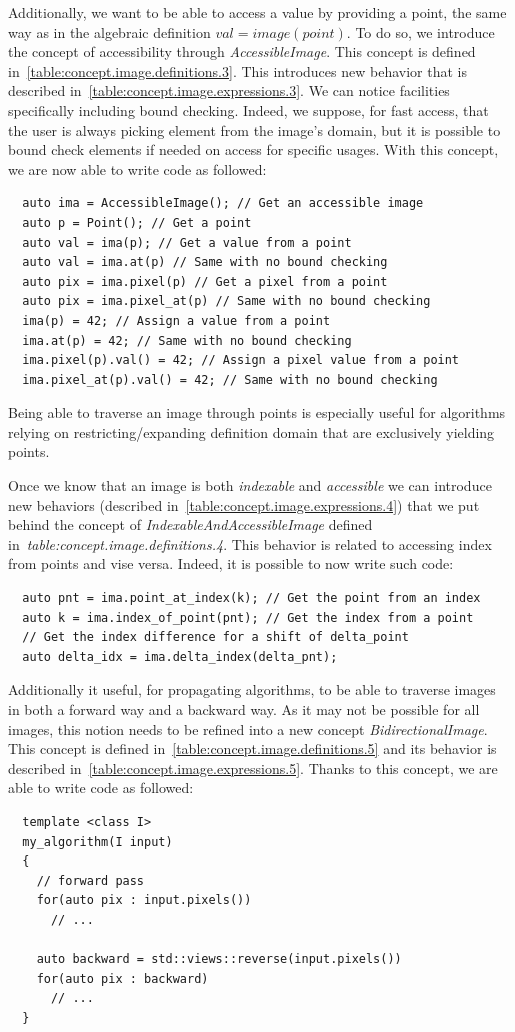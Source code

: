 Additionally, we want to be able to access a value by providing a point, the same way as in the algebraic definition
$val = image(point)$. To do so, we introduce the concept of accessibility through \emph{AccessibleImage}. This concept
is defined in~\cref{table:concept.image.definitions.3}. This introduces new behavior that is described
in~\cref{table:concept.image.expressions.3}. We can notice facilities specifically including bound checking. Indeed, we
suppose, for fast access, that the user is always picking element from the image's domain, but it is possible to bound
check elements if needed on access for specific usages. With this concept, we are now able to write code as followed:
\begin{verbatim}
  auto ima = AccessibleImage(); // Get an accessible image
  auto p = Point(); // Get a point
  auto val = ima(p); // Get a value from a point
  auto val = ima.at(p) // Same with no bound checking
  auto pix = ima.pixel(p) // Get a pixel from a point
  auto pix = ima.pixel_at(p) // Same with no bound checking
  ima(p) = 42; // Assign a value from a point
  ima.at(p) = 42; // Same with no bound checking
  ima.pixel(p).val() = 42; // Assign a pixel value from a point
  ima.pixel_at(p).val() = 42; // Same with no bound checking
\end{verbatim}
Being able to traverse an image through points is especially useful for algorithms relying on restricting/expanding
definition domain that are exclusively yielding points.

Once we know that an image is both \emph{indexable} and \emph{accessible} we can introduce new behaviors (described
in~\cref{table:concept.image.expressions.4}) that we put behind the concept of \emph{IndexableAndAccessibleImage}
defined in~\emph{table:concept.image.definitions.4}. This behavior is related to accessing index from points and vise
versa. Indeed, it is possible to now write such code:
\begin{verbatim}
  auto pnt = ima.point_at_index(k); // Get the point from an index
  auto k = ima.index_of_point(pnt); // Get the index from a point
  // Get the index difference for a shift of delta_point
  auto delta_idx = ima.delta_index(delta_pnt);
\end{verbatim}

Additionally it useful, for propagating algorithms, to be able to traverse images in both a forward way and a backward
way. As it may not be possible for all images, this notion needs to be refined into a new concept
\emph{BidirectionalImage}. This concept is defined in~\cref{table:concept.image.definitions.5} and its behavior is
described in~\cref{table:concept.image.expressions.5}. Thanks to this concept, we are able to write code as followed:
\begin{verbatim}
  template <class I>
  my_algorithm(I input)
  {
    // forward pass
    for(auto pix : input.pixels())
      // ...

    auto backward = std::views::reverse(input.pixels())
    for(auto pix : backward)
      // ...
  }
\end{verbatim}


